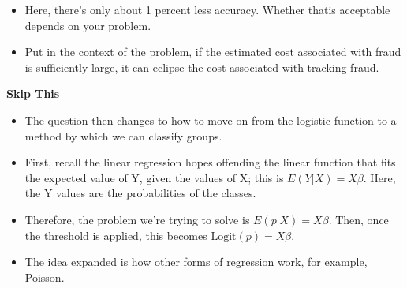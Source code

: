 \documentclass[SKL-MASTER.tex]{subfiles}
\begin{document}
	\begin{itemize}
		\item Here, there's only about 1 percent less accuracy. Whether thatis acceptable  depends on your
		problem. 
		\item Put in the context of the problem, if the estimated cost associated with fraud
		is sufficiently large, it can eclipse the cost associated with tracking fraud.
	\end{itemize}
		\newpage
		\noindent \textbf{Skip This}
		\begin{itemize}
			\item The question then changes to how to move on from the logistic function to a method by which
			we can classify groups.
			\item First, recall the linear regression hopes offending the linear function that fits the expected
			value of Y, given the values of X; this is $E(Y|X) = X\beta$. Here, the Y values are the probabilities
			of the classes. 
			\item Therefore, the problem we're trying to solve is $E(p|X) = X \beta$. Then, once the
			threshold is applied, this becomes $\mbox{Logit}(p) = X\beta$. 
			\item The idea expanded is how other forms of
			regression work, for example, Poisson.
		\end{itemize}
		\newpage
\end{document}
